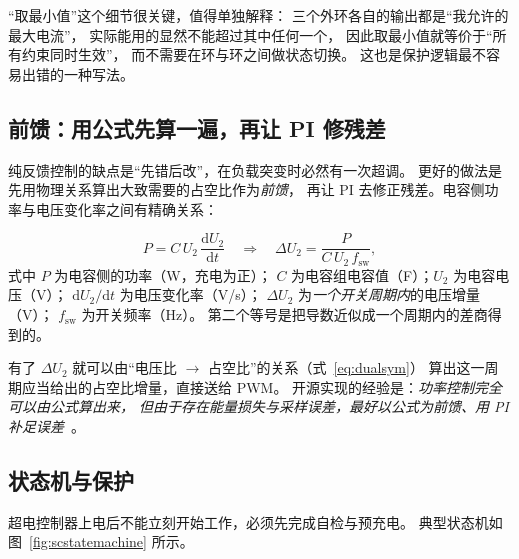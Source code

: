 \documentclass[cn,blue,11pt,device=normal]{elegantnote}
\newcommand{\dd}{\mathrm{d}}
\newcommand{\fref}[1]{式~\eqref{#1}}
\begin{document}
“取最小值”这个细节很关键，值得单独解释：
三个外环各自的输出都是“我允许的最大电流”，
实际能用的显然不能超过其中任何一个，
因此取最小值就等价于“所有约束同时生效”，
而不需要在环与环之间做状态切换。
这也是保护逻辑最不容易出错的一种写法。

\subsection{前馈：用公式先算一遍，再让 PI 修残差}

纯反馈控制的缺点是“先错后改”，在负载突变时必然有一次超调。
更好的做法是先用物理关系算出大致需要的占空比作为\emph{前馈}，
再让 PI 去修正残差。电容侧功率与电压变化率之间有精确关系：

\begin{equation}\label{eq:capvff}
  P = C\,U_2\,\frac{\dd U_2}{\dd t}
  \quad\Longrightarrow\quad
  \Delta U_2 = \frac{P}{C\,U_2\,f_{\mathrm{sw}}} ,
\end{equation}
式中 $P$ 为电容侧的功率（W，充电为正）；
$C$ 为电容组电容值（F）；$U_2$ 为电容电压（V）；
$\dd U_2/\dd t$ 为电压变化率（V/s）；
$\Delta U_2$ 为\emph{一个开关周期内}的电压增量（V）；
$f_{\mathrm{sw}}$ 为开关频率（Hz）。
第二个等号是把导数近似成一个周期内的差商得到的。

有了 $\Delta U_2$ 就可以由“电压比 $\to$ 占空比”的关系（\fref{eq:dualsym}）
算出这一周期应当给出的占空比增量，直接送给 PWM。
开源实现的经验是：\emph{功率控制完全可以由公式算出来，
但由于存在能量损失与采样误差，最好以公式为前馈、用 PI 补足误差}~\cite{hkustgzpnx}。

\subsection{状态机与保护}

超电控制器上电后不能立刻开始工作，必须先完成自检与预充电。
典型状态机如图~\ref{fig:scstatemachine} 所示。
\end{document}
